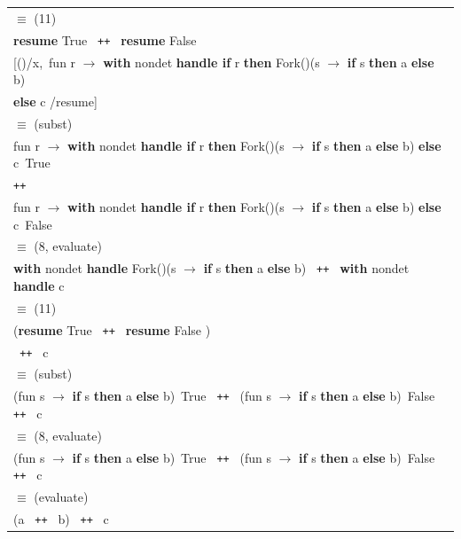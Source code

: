 \documentclass[logo,bsc,singlespacing,parskip]{infthesis}
\begin{document}
\begin{longtable}{@{}l@{}}
\quad$\equiv$ (11) \\
\textbf{resume } True \texttt{ ++ } \textbf{resume } False \\
\quad [()/x,\ fun r $\rightarrow$ \textbf{with } nondet \textbf{ handle if } r \textbf{ then } Fork()(s $\rightarrow$ \textbf{if } s \textbf{ then } a \textbf{ else } b) \\ \quad \textbf{ else } c /resume] \\

\quad$\equiv$ (subst) \\
fun r $\rightarrow$ \textbf{with } nondet \textbf{ handle if } r \textbf{ then } Fork()(s $\rightarrow$ \textbf{if } s \textbf{ then } a \textbf{ else } b) \textbf{ else } c\ True \\
\texttt{++} \\
fun r $\rightarrow$ \textbf{with } nondet \textbf{ handle if } r \textbf{ then } Fork()(s $\rightarrow$ \textbf{if } s \textbf{ then } a \textbf{ else } b) \textbf{ else } c\ False \\

\quad$\equiv$ (8, evaluate) \\
\textbf{with } nondet \textbf{ handle } Fork()(s $\rightarrow$ \textbf{if } s \textbf{ then } a \textbf{ else } b) \texttt{ ++ } \textbf{with } nondet \textbf{ handle } c \\

\quad$\equiv$ (11) \\
(\textbf{resume } True \texttt{ ++ } \textbf{resume } False 
) \\ \quad \texttt{ ++ } c \\

\quad$\equiv$ (subst) \\
(fun s $\rightarrow$ \textbf{if } s \textbf{ then } a \textbf{ else } b)\ True  \texttt{ ++ } (fun s $\rightarrow$ \textbf{if } s \textbf{ then } a \textbf{ else } b)\ False \texttt{ ++ } c \\

\quad$\equiv$ (8, evaluate) \\
(fun s $\rightarrow$ \textbf{if } s \textbf{ then } a \textbf{ else } b)\ True \texttt{ ++ } (fun s $\rightarrow$ \textbf{if } s \textbf{ then } a \textbf{ else } b)\ False \texttt{ ++ } c \\

\quad$\equiv$ (evaluate) \\
(a \texttt{ ++ } b) \texttt{ ++ } c \\
\end{longtable}
\end{document}

